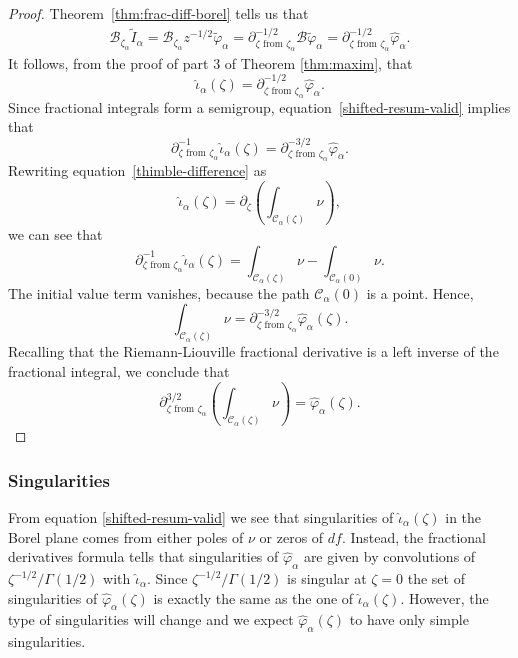 \documentclass[11pt,a4paper,twoside,leqno,noamsfonts]{amsart}
\numberwithin{equation}{section}
\begin{document}
\begin{proof}
Theorem~\ref{thm:frac-diff-borel} tells us that
\begin{align*}
\mathcal{B}_{\zeta_\alpha} \tilde{I}_\alpha  = \mathcal{B}_{\zeta_\alpha} z^{-1/2} \tilde{\varphi}_\alpha = \partial^{-1/2}_{\zeta \text{ from } \zeta_\alpha} \mathcal{B} \tilde{\varphi}_\alpha = \partial^{-1/2}_{\zeta \text{ from } \zeta_\alpha} \hat{\varphi}_\alpha.
\end{align*}
It follows, from the proof of part $3$ of Theorem \ref{thm:maxim}, that
\begin{equation}\label{shifted-resum-valid}
\hat{\iota}_\alpha(\zeta) = \partial^{-1/2}_{\zeta \text{ from } \zeta_\alpha} \hat{\varphi}_\alpha.
\end{equation}
Since fractional integrals form a semigroup, equation~\eqref{shifted-resum-valid} implies that
\[ \partial^{-1}_{\zeta \text{ from } \zeta_\alpha} \hat{\iota}_\alpha(\zeta) = \partial^{-3/2}_{\zeta \text{ from } \zeta_\alpha} \hat{\varphi}_\alpha. \]
Rewriting equation~\eqref{thimble-difference} as
\[ \hat{\iota}_\alpha(\zeta) = \partial_\zeta \left( \int_{\mathcal{C}_\alpha(\zeta)} \nu \right), \]
we can see that
\[ \partial^{-1}_{\zeta \text{ from } \zeta_\alpha} \hat{\iota}_\alpha(\zeta) = \int_{\mathcal{C}_\alpha(\zeta)} \nu - \int_{\mathcal{C}_\alpha(0)} \nu. \]
The initial value term vanishes, because the path $\mathcal{C}_\alpha(0)$ is a point. Hence,
\[ \int_{\mathcal{C}_\alpha(\zeta)} \nu = \partial^{-3/2}_{\zeta \text{ from } \zeta_\alpha} \hat{\varphi}_\alpha(\zeta). \]
Recalling that the Riemann-Liouville fractional derivative is a left inverse of the fractional integral, we conclude that
\[ \partial^{3/2}_{\zeta \text{ from } \zeta_\alpha} \left( \int_{\mathcal{C}_\alpha(\zeta)} \nu \right) = \hat{\varphi}_\alpha(\zeta). \]
\end{proof}


\subsubsection{Singularities} 
From equation \eqref{shifted-resum-valid} we see that singularities of $\hat{\iota}_{\alpha}(\zeta)$ in the Borel plane comes from either poles of $\nu$ or zeros of $df$. Instead, the fractional derivatives formula tells that singularities of $\hat{\varphi}_\alpha$ are given by convolutions of $\zeta^{-1/2}/\Gamma(1/2)$ with $\hat{\iota}_{\alpha}$. Since $\zeta^{-1/2}/\Gamma(1/2)$ is singular at $\zeta=0$ the set of singularities of $\hat{\varphi}_{\alpha}(\zeta)$ is exactly the same as the one of $\hat{\iota}_{\alpha}(\zeta)$. However, the type of singularities will change and we expect $\hat{\varphi}_{\alpha}(\zeta)$ to have only simple singularities.
\end{document}
